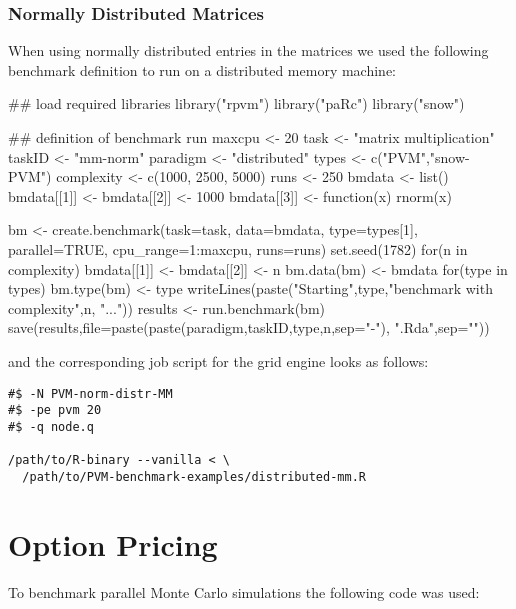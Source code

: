 \subsubsection{Normally Distributed Matrices}

When using normally distributed entries in the matrices we used the
following benchmark definition to run on a distributed memory machine:

\begin{Scode}
## load required libraries
library("rpvm")
library("paRc")
library("snow")

## definition of benchmark run
maxcpu <- 20
task <- "matrix multiplication"
taskID <- "mm-norm"
paradigm <- "distributed"
types <- c("PVM","snow-PVM")
complexity <- c(1000, 2500, 5000)
runs <- 250
bmdata <- list()
bmdata[[1]] <- bmdata[[2]] <- 1000
bmdata[[3]] <- function(x){
  rnorm(x)
}

bm <- create.benchmark(task=task, data=bmdata,
                       type=types[1], parallel=TRUE,
                       cpu_range=1:maxcpu, runs=runs)
set.seed(1782)
for(n in complexity){
  bmdata[[1]] <- bmdata[[2]] <- n
  bm.data(bm) <- bmdata
  for(type in types){
    bm.type(bm) <- type
    writeLines(paste("Starting",type,"benchmark with complexity",n,
                     "..."))
    results <- run.benchmark(bm)
    save(results,file=paste(paste(paradigm,taskID,type,n,sep="-"),
                                  ".Rda",sep=""))
  }
}
\end{Scode}

and the corresponding job script for the grid engine looks as follows:

\begin{verbatim}
#$ -N PVM-norm-distr-MM
#$ -pe pvm 20
#$ -q node.q

/path/to/R-binary --vanilla < \
  /path/to/PVM-benchmark-examples/distributed-mm.R
\end{verbatim}

\section{Option Pricing}

To benchmark parallel Monte Carlo simulations the following code was
used:

